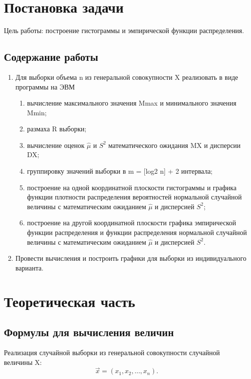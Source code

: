 \documentclass[a4paper, 14pt, unknownkeysallowed]{extreport}
\begin{document}

\setcounter{page}{2}

\chapter{Постановка задачи}
Цель работы: построение гистограммы и эмпирической функции распределения.
\section{Содержание работы}
\begin{enumerate}
	\item Для выборки объема n из генеральной совокупности X реализовать в виде программы на ЭВМ
	\begin{enumerate}
		\item вычисление максимального значения Mmax и минимального значения Mmin;
		\item размаха R выборки;
		\item вычисление оценок $\hat{\mu}$ и $S^2$ математического ожидания MX и дисперсии DX;
		\item группировку значений выборки в m = [log2 n] + 2 интервала;
		\item построение на одной координатной плоскости гистограммы и графика функции плотности распределения вероятностей нормальной случайной величины с математическим
		ожиданием  $\hat{\mu}$ и дисперсией $S^2$;
		\item построение на другой координатной плоскости графика эмпирической функции распределения и функции распределения нормальной случайной величины с математическим
		ожиданием $\hat{\mu}$ и дисперсией $S^2$.
	\end{enumerate}
	\item Провести вычисления и построить графики для выборки из индивидуального варианта.
\end{enumerate}

\chapter{Теоретическая часть}

\section{Формулы для вычисления величин}

Реализация случайной выборки из генеральной совокупности случайной величины X:
\begin{equation}
	\label{x}
	\overrightarrow{x} = (x_1, x_2,\dots,x_n).
\end{equation}
\end{document}

